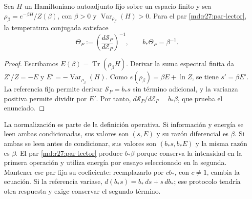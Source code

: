 \begin{theorem}
Sea $H$ un Hamiltoniano autoadjunto fijo sobre un espacio finito y sea
$\rho_\beta=e^{-\beta H}/Z(\beta)$, con $\beta>0$ y
$\operatorname{Var}_{\rho_\beta}(H)>0$. Para el par
\eqref{md:r27:par-lector}, la temperatura conjugada satisface
\begin{equation}
 \Theta_P:=\left(\frac{d\mathcal S_P}{d\mathcal E_P}\right)^{-1},
 \qquad b_*\Theta_P=\beta^{-1}.
 \label{md:r27:transductor}
\end{equation}
\end{theorem}
\begin{proof}
Escribamos $E(\beta)=\operatorname{Tr}(\rho_\beta H)$.
Derivar la suma espectral finita da
$Z'/Z=-E$ y $E'=-\operatorname{Var}_{\rho_\beta}(H)$.
Como $s(\rho_\beta)=\beta E+\ln Z$, se tiene $s'=\beta E'$.
La referencia fija permite derivar $\mathcal S_P=b_*s$ sin término adicional,
y la varianza positiva permite dividir por $E'$. Por tanto,
$d\mathcal S_P/d\mathcal E_P=b_*\beta$, que prueba el enunciado.
\end{proof}

La normalización es parte de la definición operativa. Si información y energía
se leen ambas condicionadas, sus valores son $(s,E)$ y su razón diferencial es
$\beta$. Si ambas se leen antes de condicionar, sus valores son $(b_*s,b_*E)$
y la misma razón es $\beta$. El par \eqref{md:r27:par-lector} produce
$b_*\beta$ porque conserva la intensidad en la primera operación y utiliza
energía por ensayo seleccionado en la segunda. Mantener ese par fija su
coeficiente: reemplazarlo por $cb_*$, con $c\ne1$, cambia la ecuación.
Si la referencia variase, $d(b_*s)=b_*\,ds+s\,db_*$; ese protocolo tendría
otra respuesta y exige conservar el segundo término.

